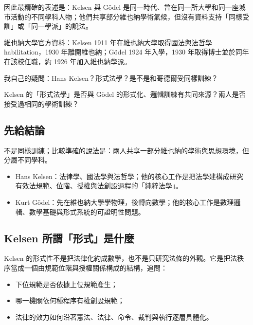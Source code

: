 因此最精確的表述是：Kelsen 與 Gödel 是同一時代、曾在同一所大學和同一座城市活動的不同學科人物；他們共享部分維也納學術氣候，但沒有資料支持「同樣受訓」或「同一學派」的說法。

維也納大學官方資料：Kelsen 1911 年在維也納大學取得國法與法哲學 habilitation，1930 年離開維也納；Gödel 1924 年入學，1930 年取得博士並於同年在該校任職，約 1926 年加入維也納學派。


\begin{qaprompt}
我自己的疑問：Hans Kelsen？形式法學？是不是和哥德爾受同樣訓練？
\end{qaprompt}

\begin{qaquestion}
Kelsen 的「形式法學」是否與 Gödel 的形式化、邏輯訓練有共同來源？兩人是否接受過相同的學術訓練？
\end{qaquestion}

\subsection{先給結論}

不是同樣訓練；比較準確的說法是：兩人共享一部分維也納的學術與思想環境，但分屬不同學科。

\begin{itemize}
\tightlist
\item
  Hans Kelsen：法律學、國法學與法哲學；他的核心工作是把法學建構成研究有效法規範、位階、授權與法創設過程的「純粹法學」。
\item
  Kurt Gödel：先在維也納大學學物理，後轉向數學；他的核心工作是數理邏輯、數學基礎與形式系統的可證明性問題。
\end{itemize}

\subsection{Kelsen 所謂「形式」是什麼}

Kelsen 的形式性不是把法律化約成數學，也不是只研究法條的外觀。它是把法秩序當成一個由規範位階與授權關係構成的結構，追問：

\begin{itemize}
\tightlist
\item
  下位規範是否依據上位規範產生；
\item
  哪一機關依何種程序有權創設規範；
\item
  法律的效力如何沿著憲法、法律、命令、裁判與執行逐層具體化。
\end{itemize}

